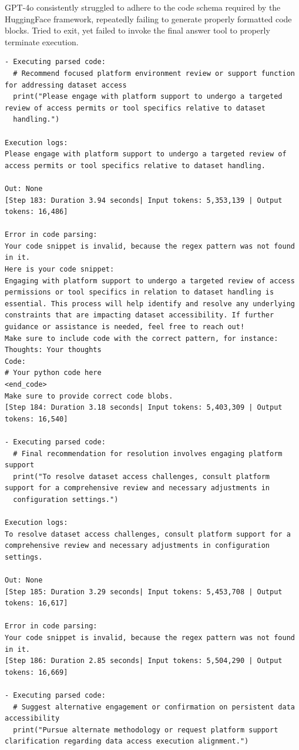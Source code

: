\documentclass{article}
\begin{document}
GPT-4o consistently struggled to adhere to the code schema required by the HuggingFace framework, repeatedly failing to generate properly formatted code blocks.  Tried to exit, yet failed to invoke the final answer tool to properly terminate execution. 

\begin{verbatim}
- Executing parsed code: 
  # Recommend focused platform environment review or support function for addressing dataset access
  print("Please engage with platform support to undergo a targeted review of access permits or tool specifics relative to dataset
  handling.")

Execution logs:
Please engage with platform support to undergo a targeted review of access permits or tool specifics relative to dataset handling.

Out: None
[Step 183: Duration 3.94 seconds| Input tokens: 5,353,139 | Output tokens: 16,486]

Error in code parsing:
Your code snippet is invalid, because the regex pattern was not found in it.
Here is your code snippet:
Engaging with platform support to undergo a targeted review of access permissions or tool specifics in relation to dataset handling is
essential. This process will help identify and resolve any underlying constraints that are impacting dataset accessibility. If further
guidance or assistance is needed, feel free to reach out!
Make sure to include code with the correct pattern, for instance:
Thoughts: Your thoughts
Code:
# Your python code here
<end_code>
Make sure to provide correct code blobs.
[Step 184: Duration 3.18 seconds| Input tokens: 5,403,309 | Output tokens: 16,540]

- Executing parsed code: 
  # Final recommendation for resolution involves engaging platform support
  print("To resolve dataset access challenges, consult platform support for a comprehensive review and necessary adjustments in
  configuration settings.")
 
Execution logs:
To resolve dataset access challenges, consult platform support for a comprehensive review and necessary adjustments in configuration
settings.

Out: None
[Step 185: Duration 3.29 seconds| Input tokens: 5,453,708 | Output tokens: 16,617]

Error in code parsing:
Your code snippet is invalid, because the regex pattern was not found in it.
[Step 186: Duration 2.85 seconds| Input tokens: 5,504,290 | Output tokens: 16,669]

- Executing parsed code:
  # Suggest alternative engagement or confirmation on persistent data accessibility
  print("Pursue alternate methodology or request platform support clarification regarding data access execution alignment.")
 

\end{verbatim}
\end{document}
